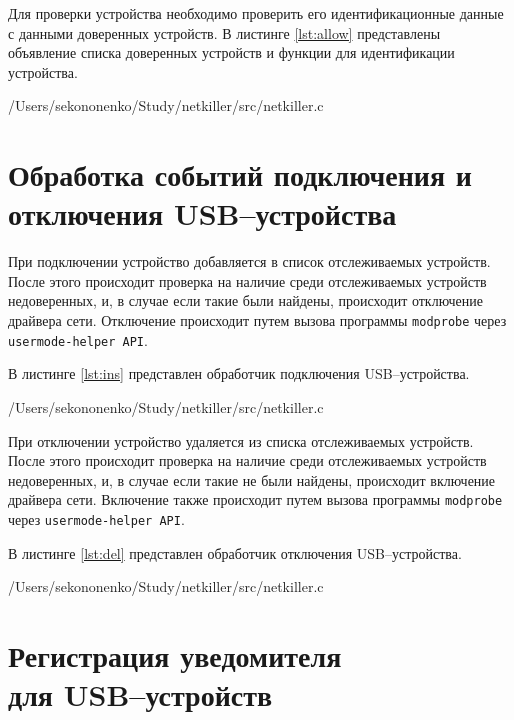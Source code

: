 Для проверки устройства необходимо проверить его идентификационные данные с данными доверенных устройств. В листинге \ref{lst:allow} представлены объявление списка доверенных устройств и функции для идентификации устройства.

\begin{lstinputlisting}[
	caption={Функции для идентификации устройств},
	label={lst:allow},
	style={c},
	linerange={16-18, 22-80},
	]{/Users/sekononenko/Study/netkiller/src/netkiller.c}
\end{lstinputlisting}

\section{Обработка событий подключения и отключения USB--устройства}

При подключении устройство добавляется в список отслеживаемых устройств. После этого происходит проверка на наличие среди отслеживаемых устройств недоверенных, и, в случае если такие были найдены, происходит отключение драйвера сети. Отключение происходит путем вызова программы \texttt{modprobe} через \texttt{usermode-helper API}.

В листинге \ref{lst:ins} представлен обработчик подключения USB--устройства.

\begin{lstinputlisting}[
	caption={Обработчик подключения USB--устройства},
	label={lst:ins},
	style={c},
	linerange={105-134},
	]{/Users/sekononenko/Study/netkiller/src/netkiller.c}
\end{lstinputlisting}

При отключении устройство удаляется из списка отслеживаемых устройств. После этого происходит проверка на наличие среди отслеживаемых устройств недоверенных, и, в случае если такие не были найдены, происходит включение драйвера сети. Включение также происходит путем вызова программы \texttt{modprobe} через \texttt{usermode-helper API}.

В листинге \ref{lst:del} представлен обработчик отключения USB--устройства.

\begin{lstinputlisting}[
	caption={Обработчик отключения USB--устройства},
	label={lst:del},
	style={c},
	linerange={137-166},
	]{/Users/sekononenko/Study/netkiller/src/netkiller.c}
\end{lstinputlisting}

\section{Регистрация уведомителя\\ для USB--устройств}

